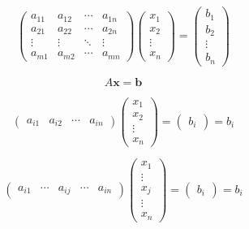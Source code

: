 \documentclass[
]{book}
\theoremstyle{definition}
\theoremstyle{definition}
\theoremstyle{definition}
\theoremstyle{definition}
\theoremstyle{remark}
\begin{document}
\[
\begin{pmatrix}a_{{\scriptscriptstyle 11}} & a_{{\scriptscriptstyle 12}} & \cdots & a_{{\scriptscriptstyle 1n}}\\
a_{{\scriptscriptstyle 21}} & a_{{\scriptscriptstyle 22}} & \cdots & a_{{\scriptscriptstyle 2n}}\\
\vdots & \vdots & \ddots & \vdots\\
a_{{\scriptscriptstyle m1}} & a_{{\scriptscriptstyle m2}} & \cdots & a_{{\scriptscriptstyle mn}}
\end{pmatrix}\begin{pmatrix}x_{{\scriptscriptstyle 1}}\\
x_{{\scriptscriptstyle 2}}\\
\vdots\\
x_{{\scriptscriptstyle n}}
\end{pmatrix}=\begin{pmatrix}b_{{\scriptscriptstyle 1}}\\
b_{{\scriptscriptstyle 2}}\\
\vdots\\
b_{{\scriptscriptstyle n}}
\end{pmatrix}
\]

\[
A\boldsymbol{x}=\boldsymbol{b}
\]

\[
\begin{pmatrix}a_{{\scriptscriptstyle i1}} & a_{{\scriptscriptstyle i2}} & \cdots & a_{{\scriptscriptstyle in}}\end{pmatrix}\begin{pmatrix}x_{{\scriptscriptstyle 1}}\\
x_{{\scriptscriptstyle 2}}\\
\vdots\\
x_{{\scriptscriptstyle n}}
\end{pmatrix}=\begin{pmatrix}b_{{\scriptscriptstyle i}}\end{pmatrix}=b_{{\scriptscriptstyle i}}
\]

\[
\begin{pmatrix}a_{{\scriptscriptstyle i1}} & \cdots & a_{{\scriptscriptstyle ij}} & \cdots & a_{{\scriptscriptstyle in}}\end{pmatrix}\begin{pmatrix}x_{{\scriptscriptstyle 1}}\\
\vdots\\
x_{{\scriptscriptstyle j}}\\
\vdots\\
x_{{\scriptscriptstyle n}}
\end{pmatrix}=\begin{pmatrix}b_{{\scriptscriptstyle i}}\end{pmatrix}=b_{{\scriptscriptstyle i}}
\]
\end{document}
